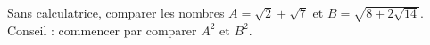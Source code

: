 
\begin{exercice}\label{exosmath-0266}

    Sans calculatrice, comparer les nombres \( A=\sqrt{2}+\sqrt{7}\) et \( B=\sqrt{8+2\sqrt{14}}\). Conseil : commencer par comparer \( A^2\) et \( B^2\).

\end{exercice}
